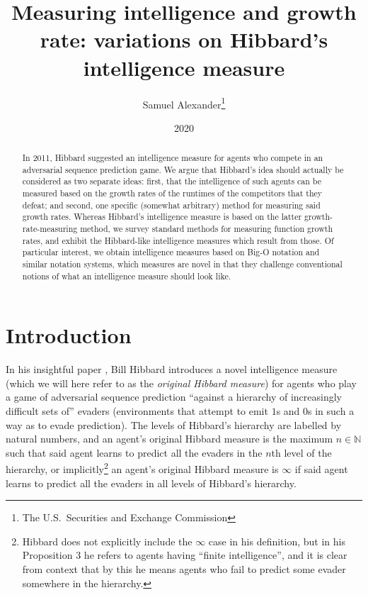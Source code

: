 \documentclass{article}
\title{Measuring intelligence and growth rate: variations on
Hibbard's intelligence measure}
\author{Samuel Alexander\thanks{The U.S.\ Securities and Exchange Commission}}
\date{2020}
\begin{document}
\maketitle

\begin{abstract}
    In 2011, Hibbard suggested an intelligence measure for agents
    who compete in an adversarial sequence prediction game. We argue
    that Hibbard's idea should actually be considered as two separate
    ideas: first, that the intelligence of such agents can be measured
    based on the growth rates of the runtimes of the competitors that
    they defeat; and second, one specific (somewhat arbitrary) method for measuring said
    growth rates. Whereas Hibbard's intelligence measure is based on the latter
    growth-rate-measuring method, we survey
    standard methods for measuring function
    growth rates, and exhibit the Hibbard-like intelligence measures
    which result from those. Of particular interest, we obtain intelligence measures
    based on Big-O notation and similar notation systems, which measures
    are novel in that they challenge conventional notions of what an
    intelligence measure should look like.
\end{abstract}

\section{Introduction}

In his insightful paper \cite{hibbard}, Bill Hibbard introduces a novel
intelligence measure (which we will here refer to as the \emph{original Hibbard measure})
for agents who play a game of adversarial sequence prediction
\cite{hibbard2008adversarial}
``against a hierarchy of increasingly difficult sets of'' evaders (environments that attempt
to emit $1$s and $0$s in such a way as to evade prediction).
The levels of Hibbard's hierarchy are labelled by natural numbers, and
an agent's original Hibbard measure is the maximum $n\in\mathbb N$ such that
said agent learns to predict all the evaders in the $n$th level of the hierarchy,
or implicitly\footnote{Hibbard does not explicitly include the $\infty$ case in his
definition, but in his Proposition 3 he refers to agents having ``finite intelligence'', and
it is clear from context that by this he means agents who fail to predict some evader
somewhere in the hierarchy.} an agent's original Hibbard measure is $\infty$
if said agent learns to predict all the evaders in all levels of Hibbard's hierarchy.
\end{document}
